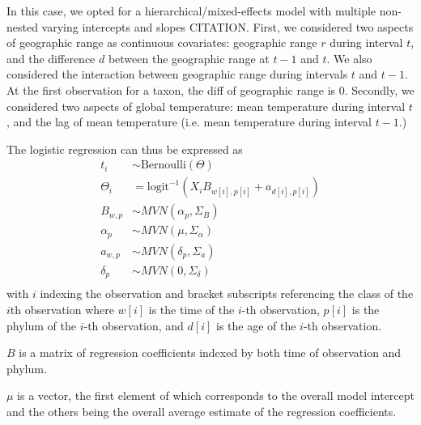 \documentclass[12pt,letterpaper]{article}
\begin{document}
In this case, we opted for a hierarchical/mixed-effects model with multiple non-nested varying intercepts and slopes CITATION. First, we considered two aspects of geographic range as continuous covariates: geographic range \(r\) during interval \(t\), and the difference \(d\) between the geographic range at \(t - 1\) and \(t\). We also considered the interaction between geographic range during intervals \(t\) and \(t - 1\). At the first observation for a taxon, the diff of geographic range is 0. Secondly, we considered two aspects of global temperature: mean temperature during interval \(t\), and the lag of mean temperature (i.e. mean temperature during interval \(t - 1\).)

The logistic regression can thus be expressed as 
\begin{equation}
  \begin{aligned}
    t_{i} &\sim \text{Bernoulli}(\Theta) \\
    \Theta_{i} &= \text{logit}^{-1} (X_{i} B_{w[i], p[i]} + a_{d[i], p[i]}) \\
    B_{w, p} &\sim MVN(\alpha_{p}, \Sigma_{B}) \\
    \alpha_{p} &\sim MVN(\mu, \Sigma_{\alpha}) \\
    a_{w, p} &\sim MVN(\delta_{p}, \Sigma_{a}) \\
    \delta_{p} &\sim MVN(0, \Sigma_{\delta}) \\
  \end{aligned}
  \label{eq:core}
\end{equation}
with \(i\) indexing the observation and bracket subscripts referencing the class of the \(i\)th observation where \(w[i]\) is the time of the \(i\)-th observation, \(p[i]\) is the phylum of the \(i\)-th observation, and \(d[i]\) is the age of the \(i\)-th observation.

\(B\) is a matrix of regression coefficients indexed by both time of observation and phylum.

\(\mu\) is a vector, the first element of which corresponds to the overall model intercept and the others being the overall average estimate of the regression coefficients.
\end{document}
